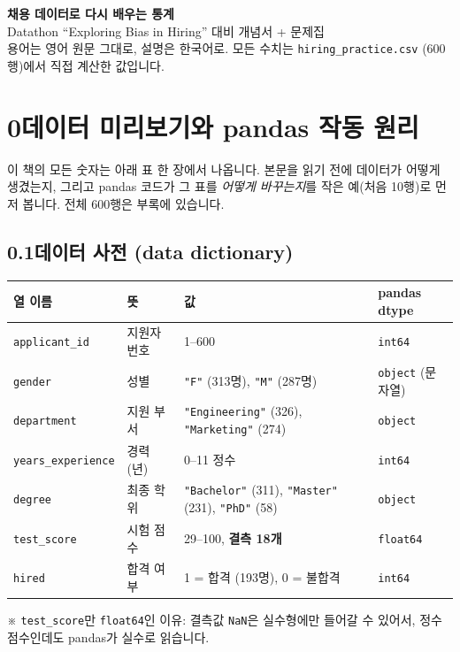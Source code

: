 \documentclass[11pt,a4paper]{article}
\newcommand{\code}[1]{\texttt{#1}}
\newcommand{\aside}[1]{{\footnotesize\color{black!65}#1}}
\begin{document}
\begin{center}
{\LARGE\textbf{채용 데이터로 다시 배우는 통계}}\\[0.4em]
{\large Datathon ``Exploring Bias in Hiring'' 대비 개념서 + 문제집}\\[0.3em]
{\small 용어는 영어 원문 그대로, 설명은 한국어로. 모든 수치는 \code{hiring\_practice.csv} (600행)에서 직접 계산한 값입니다.}
\end{center}

\clearpage

\clearpage
\renewcommand{\contentsname}{목차 (Contents)}
\tableofcontents
\newpage

\section*{0\quad 데이터 미리보기와 pandas 작동 원리}
\markboth{}{}

이 책의 모든 숫자는 아래 표 한 장에서 나옵니다. 본문을 읽기 전에 데이터가 어떻게 생겼는지, 그리고 pandas 코드가 그 표를 \emph{어떻게 바꾸는지}를 작은 예(처음 10행)로 먼저 봅니다. 전체 600행은 부록에 있습니다.

\subsection*{0.1\quad 데이터 사전 (data dictionary)}
\begin{center}
\begin{tabular}{@{}l l p{6.6cm} l@{}}
\toprule
열 이름 & 뜻 & 값 & pandas dtype \\
\midrule
\code{applicant\_id} & 지원자 번호 & 1–600 & \code{int64} \\
\code{gender} & 성별 & \code{"F"} (313명), \code{"M"} (287명) & \code{object} (문자열) \\
\code{department} & 지원 부서 & \code{"Engineering"} (326), \code{"Marketing"} (274) & \code{object} \\
\code{years\_experience} & 경력 (년) & 0–11 정수 & \code{int64} \\
\code{degree} & 최종 학위 & \code{"Bachelor"} (311), \code{"Master"} (231), \code{"PhD"} (58) & \code{object} \\
\code{test\_score} & 시험 점수 & 29–100, \textbf{결측 18개} & \code{float64} \\
\code{hired} & 합격 여부 & 1 = 합격 (193명), 0 = 불합격 & \code{int64} \\
\bottomrule
\end{tabular}
\end{center}
\aside{※ \code{test\_score}만 \code{float64}인 이유: 결측값 \code{NaN}은 실수형에만 들어갈 수 있어서, 정수 점수인데도 pandas가 실수로 읽습니다.}
\end{document}
